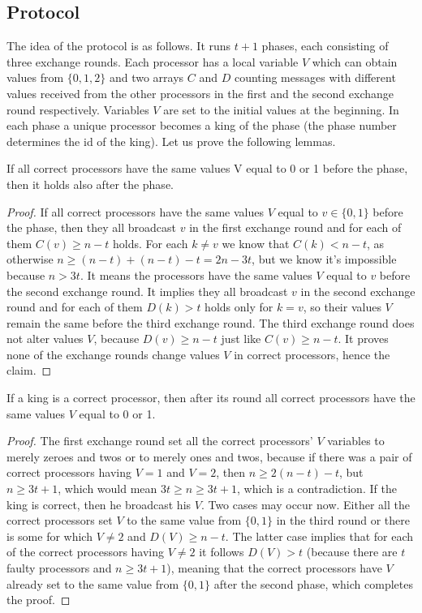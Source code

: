 \documentclass[11pt, a4paper]{report}
\begin{document}
\subsection*{Protocol}
The idea of the protocol is as follows. It runs $t+1$ phases, each consisting of three exchange rounds. Each processor has a local variable $V$ which can obtain values from $\{0,1,2\}$ and two arrays $C$ and $D$ counting messages with different values received from the other processors in the first and the second exchange round respectively. Variables $V$ are set to the initial values at the beginning. In each phase a unique processor becomes a king of the phase (the phase number determines the id of the king). Let us prove the following lemmas.
\begin{lem}
If all correct processors have the same values V equal to 0 or 1 before the phase, then it holds also after the phase.
\end{lem}
\begin{proof}
If all correct processors have the same values $V$ equal to $v\in\{0,1\}$ before the phase, then they all broadcast $v$ in the first exchange round and for each of them $C(v) \geq n-t$ holds. For each $k\neq v$ we know that $C(k) < n-t$, as otherwise $n\geq (n-t) + (n-t) - t = 2n-3t$, but we know it's impossible because $n>3t$. It means the processors have the same values $V$ equal to $v$ before the second exchange round. It implies they all broadcast $v$ in the second exchange round and for each of them $D(k)>t$ holds only for $k=v$, so their values $V$ remain the same before the third exchange round. The third exchange round does not alter values $V$, because $D(v)\geq n-t$ just like $C(v)\geq n-t$. It proves none of the exchange rounds change values $V$ in correct processors, hence the claim.
\end{proof}
\begin{lem}
If a king is a correct processor, then after its round all correct processors have the same values $V$ equal to 0 or 1.
\end{lem}
\begin{proof}
The first exchange round set all the correct processors' $V$ variables to merely zeroes and twos or to merely ones and twos, because if there was a pair of correct processors having $V=1$ and $V=2$, then $n\ge2(n-t)-t$, but $n\geq 3t+1$, which would mean $3t\ge n \ge 3t+1$, which is a contradiction. If the king is correct, then he broadcast his $V$. Two cases may occur now. Either all the correct processors set $V$ to the same value from $\{0,1\}$ in the third round or there is some for which $V\neq2$ and $D(V)\ge n-t$. The latter case implies that for each of the correct processors having $V\neq2$ it follows $D(V)>t$ (because there are $t$ faulty processors and $n\geq 3t+1$), meaning that the correct processors have $V$ already set to the same value from $\{0,1\}$ after the second phase, which completes the proof.
\end{proof}
\end{document}
